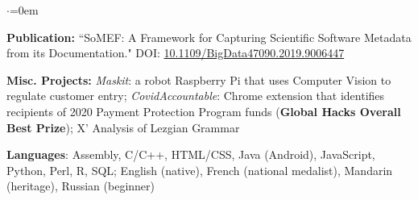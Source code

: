 \begin{list}{$\cdot$}{\leftmargin=0em} %
   \item \textbf{Publication:} ``SoMEF: A Framework for Capturing Scientific Software Metadata from its Documentation." DOI: \href{https://doi.org/10.1109/BigData47090.2019.9006447}{10.1109/BigData47090.2019.9006447}
   \item \textbf{Misc. Projects:} \textit{Maskit}: a robot Raspberry Pi that uses Computer Vision to regulate customer entry; \textit{CovidAccountable}: Chrome extension that identifies recipients of 2020 Payment Protection Program funds (\textbf{Global Hacks Overall Best Prize}); X' Analysis of Lezgian Grammar
   \item \textbf{Languages}: Assembly, C/C++, HTML/CSS, Java (Android), JavaScript, Python, Perl, R, SQL; English (native), French (national medalist), Mandarin (heritage), Russian (beginner)
\end{list}
